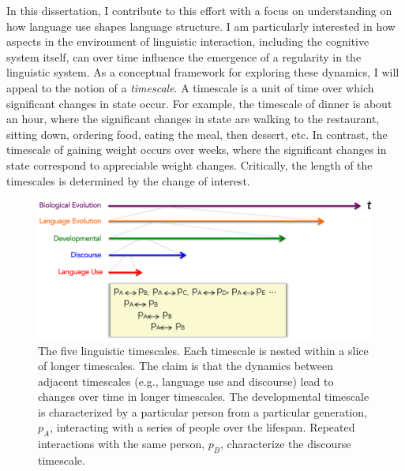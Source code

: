 In this dissertation, I contribute to this effort with a focus on understanding on how language use shapes language structure. I am particularly interested in how  aspects in the environment of linguistic interaction, including the cognitive system itself, can over time influence the emergence of a regularity in the linguistic system. As a conceptual framework for exploring these dynamics, I will appeal to the notion of a {\it timescale}. A timescale is a unit of time over which significant changes in state occur. For example, the timescale of dinner is about an hour, where the significant changes in state are walking to the restaurant, sitting down, ordering food, eating the meal, then dessert, etc. In contrast, the timescale of gaining weight occurs over weeks, where the significant changes in state correspond to appreciable weight changes. Critically, the length of the timescales is determined by the change of interest. 

\begin{figure}
\begin{center} 
\includegraphics[width=6in]{figs/timescales2}
\caption{The five linguistic timescales. Each timescale is nested within a slice of longer timescales. The claim is that the dynamics between adjacent timescales (e.g., language use and discourse) lead to changes over time in longer timescales. The developmental timescale is characterized by a particular person from a particular generation, $p_A$, interacting with a series of people over the lifespan. Repeated interactions with the same person, $p_B$, characterize the discourse timescale.}
\label{fig:timescales}
\end{center} 
\end{figure}



